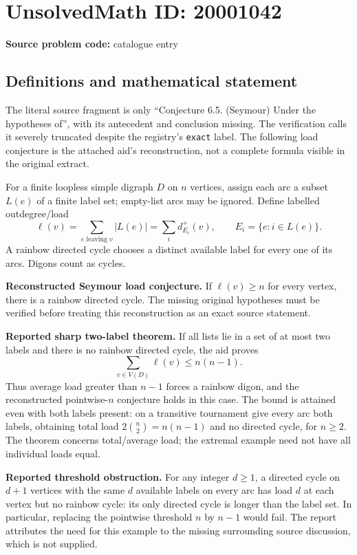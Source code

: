 \documentclass[11pt]{article}
\begin{document}
\section*{UnsolvedMath ID: 20001042}
\textbf{Source problem code:} catalogue entry
\subsection{Definitions and mathematical statement}
The literal source fragment is only ``Conjecture 6.5. (Seymour) Under the hypotheses of'', with its antecedent and conclusion missing. The verification calls it severely truncated despite the registry's \texttt{exact} label. The following load conjecture is the attached aid's reconstruction, not a complete formula visible in the original extract.

For a finite loopless simple digraph $D$ on $n$ vertices, assign each arc a subset $L(e)$ of a finite label set; empty-list arcs may be ignored. Define labelled outdegree/load
\[
 \ell(v)=\sum_{e\text{ leaving }v}|L(e)|=\sum_i d^+_{E_i}(v),
 \qquad E_i=\{e:i\in L(e)\}.
\]
A rainbow directed cycle chooses a distinct available label for every one of its arcs. Digons count as cycles.

\textbf{Reconstructed Seymour load conjecture.} If $\ell(v)\geq n$ for every vertex, there is a rainbow directed cycle. The missing original hypotheses must be verified before treating this reconstruction as an exact source statement.

\textbf{Reported sharp two-label theorem.} If all lists lie in a set of at most two labels and there is no rainbow directed cycle, the aid proves
\[
 \sum_{v\in V(D)}\ell(v)\leq n(n-1).
\]
Thus average load greater than $n-1$ forces a rainbow digon, and the reconstructed pointwise-$n$ conjecture holds in this case. The bound is attained even with both labels present: on a transitive tournament give every arc both labels, obtaining total load $2\binom n2=n(n-1)$ and no directed cycle, for $n\geq2$. The theorem concerns total/average load; the extremal example need not have all individual loads equal.

\textbf{Reported threshold obstruction.} For any integer $d\geq1$, a directed cycle on $d+1$ vertices with the same $d$ available labels on every arc has load $d$ at each vertex but no rainbow cycle: its only directed cycle is longer than the label set. In particular, replacing the pointwise threshold $n$ by $n-1$ would fail. The report attributes the need for this example to the missing surrounding source discussion, which is not supplied.
\end{document}
